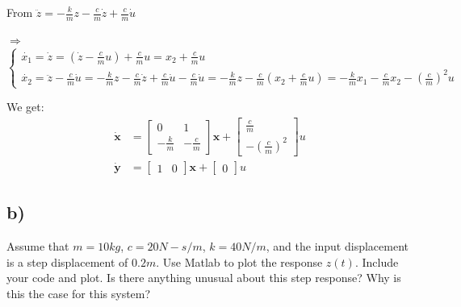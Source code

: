 From $\ddot{z} = -\frac{k}{m}z-\frac{c}{m}\dot{z}+\frac{c}{m}\dot{u}$ 

$\Rightarrow$     
$\left\{
    \begin{array}{lr}
    \dot{x_1} = \dot{z} = \left(\dot{z} - \frac{c}{m}u\right) +  \frac{c}{m}u = x_2 + \frac{c}{m}u\\
    \dot{x_2} = \ddot{z} - \frac{c}{m}\dot{u} = -\frac{k}{m}z-\frac{c}{m}\dot{z}+\frac{c}{m}\dot{u} - \frac{c}{m}\dot{u} = -\frac{k}{m}z - \frac{c}{m}(x_2 + \frac{c}{m}u) = -\frac{k}{m}x_1 - \frac{c}{m}x_2 - \left(\frac{c}{m}\right)^2u
    \end{array}
\right.$ 

We get: 
\begin{equation}
    \begin{aligned}
        \dot{\textbf{x}} &=
        \begin{bmatrix}
            0 & 1 \\
            -\frac{k}{m} & -\frac{c}{m}
        \end{bmatrix}
        \textbf{x} + 
        \begin{bmatrix}
            \frac{c}{m}\\
            -\left(\frac{c}{m}\right)^2
        \end{bmatrix}
        u
        \\
        \dot{\textbf{y}} &=
        \begin{bmatrix}
            1 & 0
        \end{bmatrix}
        \textbf{x} + 
        \begin{bmatrix}
            0
        \end{bmatrix}
        u
    \end{aligned}
\end{equation}
\subsection{b)}
Assume that $m =10 kg$, $c =20 N-s/m$, $k =40 N/m$, and the input displacement is a step displacement of $0.2 m$. Use Matlab to plot the response $z(t)$. Include your code and plot. Is there anything unusual about this step response? Why is this the case for this system?

